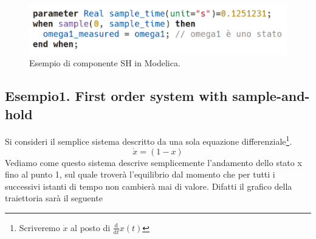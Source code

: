 \begin{figure}[h]
    \centering
    \includegraphics[width=120mm]{Intro/SH.png}
    \caption{Esempio di componente SH in Modelica.}
    \label{fig:SampleAndHoldComponentModelica}
\end{figure}
\newpage
\subsection*{Esempio1. First order system with sample-and-hold}
Si consideri il semplice sistema descritto da una sola equazione differenziale\footnote{Scriveremo $\dot{x}$ al posto di $\frac{\mathrm{d}}{\mathrm{d}t}x(t)$}.
\begin{equation}
    \dot{x} = (1 - x)
\end{equation}
Vediamo come questo sistema descrive semplicemente l'andamento dello stato x fino al punto 1, sul quale troverà l'equilibrio dal momento che per tutti i successivi istanti di tempo non cambierà mai di valore. Difatti il grafico della traiettoria sarà il seguente\\
